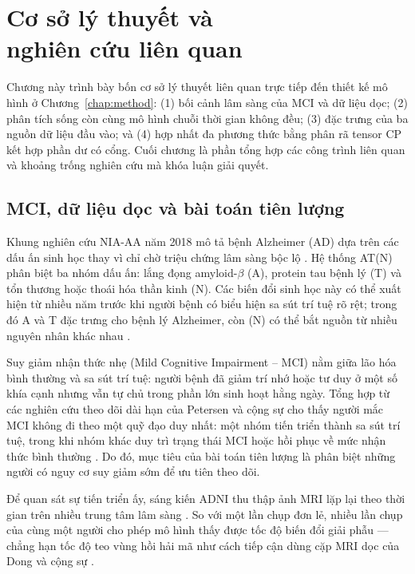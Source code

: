 \chapter[Cơ sở lý thuyết và nghiên cứu liên quan]{Cơ sở lý thuyết và\\nghiên cứu liên quan}
\label{chap:background}

Chương này trình bày bốn cơ sở lý thuyết liên quan trực tiếp đến thiết kế mô hình ở Chương~\ref{chap:method}: (1) bối cảnh lâm sàng của MCI và dữ liệu dọc; (2) phân tích sống còn cùng mô hình chuỗi thời gian không đều; (3) đặc trưng của ba nguồn dữ liệu đầu vào; và (4) hợp nhất đa phương thức bằng phân rã tensor CP kết hợp phần dư có cổng. Cuối chương là phần tổng hợp các công trình liên quan và khoảng trống nghiên cứu mà khóa luận giải quyết.

\section{MCI, dữ liệu dọc và bài toán tiên lượng}
Khung nghiên cứu NIA-AA năm 2018 mô tả bệnh Alzheimer (AD) dựa trên các dấu ấn sinh học thay vì chỉ chờ triệu chứng lâm sàng bộc lộ \cite{jack2018niaaa}. Hệ thống AT(N) phân biệt ba nhóm dấu ấn: lắng đọng amyloid-$\beta$ (A), protein tau bệnh lý (T) và tổn thương hoặc thoái hóa thần kinh (N). Các biến đổi sinh học này có thể xuất hiện từ nhiều năm trước khi người bệnh có biểu hiện sa sút trí tuệ rõ rệt; trong đó A và T đặc trưng cho bệnh lý Alzheimer, còn (N) có thể bắt nguồn từ nhiều nguyên nhân khác nhau \cite{jack2018niaaa}.

Suy giảm nhận thức nhẹ (Mild Cognitive Impairment -- MCI) nằm giữa lão hóa bình thường và sa sút trí tuệ: người bệnh đã giảm trí nhớ hoặc tư duy ở một số khía cạnh nhưng vẫn tự chủ trong phần lớn sinh hoạt hằng ngày. Tổng hợp từ các nghiên cứu theo dõi dài hạn của Petersen và cộng sự cho thấy người mắc MCI không đi theo một quỹ đạo duy nhất: một nhóm tiến triển thành sa sút trí tuệ, trong khi nhóm khác duy trì trạng thái MCI hoặc hồi phục về mức nhận thức bình thường \cite{petersen2018mci}. Do đó, mục tiêu của bài toán tiên lượng là phân biệt những người có nguy cơ suy giảm sớm để ưu tiên theo dõi.

Để quan sát sự tiến triển ấy, sáng kiến ADNI thu thập ảnh MRI lặp lại theo thời gian trên nhiều trung tâm lâm sàng \cite{jack2008adnimri,weiner2015impact}. So với một lần chụp đơn lẻ, nhiều lần chụp của cùng một người cho phép mô hình thấy được tốc độ biến đổi giải phẫu — chẳng hạn tốc độ teo vùng hồi hải mã như cách tiếp cận dùng cặp MRI dọc của Dong và cộng sự \cite{dong2021deepatrophy}.


